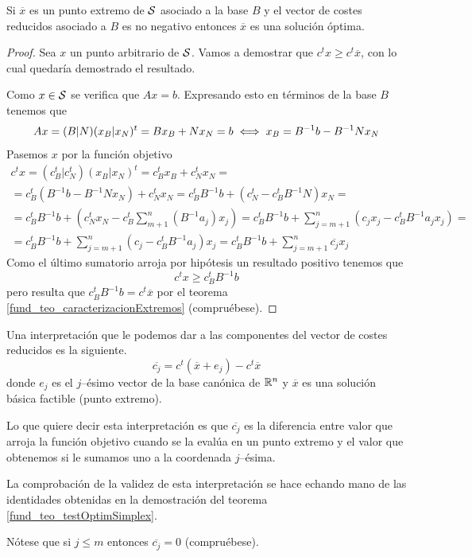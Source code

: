 \begin{theo}
	\label{fund_teo_testOptimSimplex}
	Si $\overline{x}$ es un punto extremo de $\mathcal{S}$ asociado a la base $B$ y el vector de costes reducidos asociado a $B$ es no negativo entonces $\overline{x}$ es una solución óptima.
\end{theo}
\begin{proof}
	Sea $x$ un punto arbitrario de $\mathcal{S}$. Vamos a demostrar que $c^tx\geq c^t\overline{x}$, con lo cual quedaría demostrado el resultado.
	
	Como $x\in \mathcal{S}$ se verifica que $Ax=b$. Expresando esto en términos de la base $B$ tenemos que
	\begin{equation}
	\label{fund_eq_problema}
		Ax=(B|N)(x_B|x_N)^t=Bx_B+Nx_N=b\iff x_B=B^{-1}b-B^{-1}Nx_N
	\end{equation}
	Pasemos $x$ por la función objetivo
	\begin{multline}
		\label{fund_eq_funcionObj}
		c^tx=(c_{B}^t|c_N^t)(x_B|x_N)^t=c_B^tx_B+c_N^tx_N=\\
		=c_B^t(B^{-1}b-B^{-1}Nx_N)+c_N^tx_N=c_B^tB^{-1}b+(c_N^t-c_B^tB^{-1}N)x_N=\\
		=c_B^tB^{-1}b+\left(c_N^tx_N-c_B^t\sum_{m+1}^{n}(B^{-1}a_j)x_j\right)=c_B^tB^{-1}b+\sum_{j=m+1}^{n}(c_jx_j-c_B^tB^{-1}a_jx_j)=\\
		=c_B^tB^{-1}b+\sum_{j=m+1}^{n}(c_j-c_B^tB^{-1}a_j)x_j=c_B^tB^{-1}b+\sum_{j=m+1}^{n}\overline{c_j}x_j
	\end{multline}
	Como el último sumatorio arroja por hipótesis un resultado positivo tenemos que
	\begin{equation*}
		c^tx\geq c_B^tB^{-1}b
	\end{equation*}
	pero resulta que $c_B^tB^{-1}b=c^t\overline{x}$ por el teorema \ref{fund_teo_caracterizacionExtremos} (compruébese). 
\end{proof}
\begin{obs}
	Una interpretación que le podemos dar a las componentes del vector de costes reducidos es la siguiente.
	\begin{equation*}
		\overline{c_j}=c^t(\overline{x}+e_j)-c^t\overline{x}
	\end{equation*}
	donde $e_j$ es el $j$--ésimo vector de la base canónica de $\mathbb{R}^n$ y $\overline{x}$ es una solución básica factible (punto extremo).
	
	Lo que quiere decir esta interpretación es que $\overline{c_j}$ es la diferencia entre valor que arroja la función objetivo cuando se la evalúa en un punto extremo y el valor que obtenemos si le sumamos uno a la coordenada $j$--ésima.
	
	La comprobación de la validez de esta interpretación se hace echando mano de las identidades obtenidas en la demostración del teorema \ref{fund_teo_testOptimSimplex}.
	
	Nótese que si $j\leq m$ entonces $\overline{c_j}=0$ (compruébese).
\end{obs}

